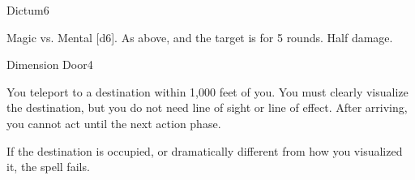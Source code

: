 \begin{spellsection}{Dictum}{6}
    \begin{spellheader}
    \end{spellheader}
    \begin{spellcontent}
        \begin{spelltargetinginfo}
        \end{spelltargetinginfo}
        \begin{spelleffects}
            \begin{spellattack}{Magic vs. Mental}
                \spellsuccess {}[d6].
                \spellcritical As above, and the target is \immobilized for 5 rounds.
                \spellfailure Half damage.
            \end{spellattack}
        \end{spelleffects}
    \end{spellcontent}
    \begin{spellfooter}
        \miscastexplode
    \end{spellfooter}
\end{spellsection}

\begin{spellsection}{Dimension Door}{4}
    \begin{spellheader}
    \end{spellheader}
    \begin{spellcontent}
        \begin{spelltargetinginfo}
        \end{spelltargetinginfo}
        \begin{spelleffects}
            \spelleffect You teleport to a destination within 1,000 feet of you. You must clearly visualize the destination, but you do not need line of sight or line of effect. After arriving, you cannot act until the next action phase.

            If the destination is occupied, or dramatically different from how you visualized it, the spell fails.
        \end{spelleffects}
    \end{spellcontent}
    \begin{spellfooter}
        \miscastexplode
    \end{spellfooter}
\end{spellsection}

